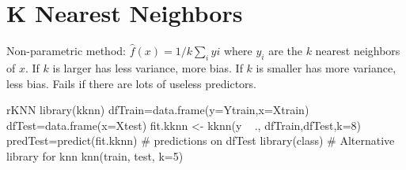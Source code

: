 \section*{K Nearest Neighbors}
Non-parametric method: $\hat f(x)=1/k \sum_i yi$ where $y_i$ are the $k$ nearest neighbors of $x$. If $k$ is larger has less variance, more bias. If $k$ is smaller has more variance, less bias.
Fails if there are lots of useless predictors.

\begin{codebox}{r}{KNN}
library(kknn)
dfTrain=data.frame(y=Ytrain,x=Xtrain)
dfTest=data.frame(x=Xtest)
fit.kknn <- kknn(y ~ ., dfTrain,dfTest,k=8)
predTest=predict(fit.kknn) # predictions on dfTest
library(class) # Alternative library for knn
knn(train, test, k=5)
\end{codebox}
